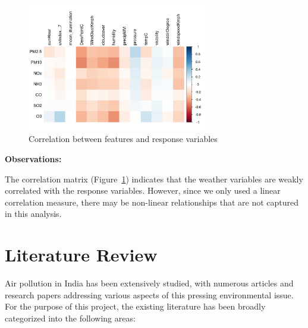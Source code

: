 \documentclass[12pt]{article}
\begin{document}
\begin{figure}[H]
    \centering
    \includegraphics[width=0.7\textwidth]{feature-response-correlation.png}
    \caption{Correlation between features and response variables}
    \label{fig:feature_response_correlation}
\end{figure}

\textbf{Observations:}

The correlation matrix (Figure~\ref{fig:feature_response_correlation}) indicates that the weather variables are weakly correlated with the response variables. However, since we only used a linear correlation measure, there may be non-linear relationships that are not captured in this analysis.

\newpage




\section{Literature Review}

Air pollution in India has been extensively studied, with numerous articles and research papers addressing various aspects of this pressing environmental issue. For the purpose of this project, the existing literature has been broadly categorized into the following areas:
\end{document}
